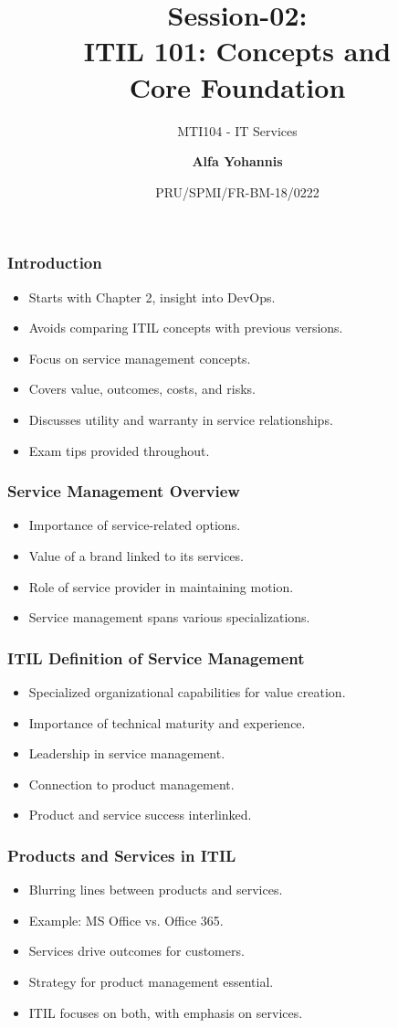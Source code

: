 \documentclass[aspectratio=169, table]{beamer}
\subtitle{MTI104 - IT Services}
\title{Session-02:\\\LARGE{ITIL 101: Concepts and\\Core Foundation}}
\date[Serial]{\scriptsize {PRU/SPMI/FR-BM-18/0222}}
\author[Pradita]{\small{\textbf{Alfa Yohannis}}}
\begin{document}
\frame{\titlepage}

\begin{frame}
	\frametitle{Introduction}
	\begin{itemize}
		\item Starts with Chapter 2, insight into DevOps.
		\item Avoids comparing ITIL concepts with previous versions.
		\item Focus on service management concepts.
		\item Covers value, outcomes, costs, and risks.
		\item Discusses utility and warranty in service relationships.
		\item Exam tips provided throughout.
	\end{itemize}
\end{frame}

\begin{frame}
	\frametitle{Service Management Overview}
	\begin{itemize}
		\item Importance of service-related options.
		\item Value of a brand linked to its services.
		\item Role of service provider in maintaining motion.
		\item Service management spans various specializations.
	\end{itemize}
\end{frame}

\begin{frame}
	\frametitle{ITIL Definition of Service Management}
	\begin{itemize}
		\item Specialized organizational capabilities for value creation.
		\item Importance of technical maturity and experience.
		\item Leadership in service management.
		\item Connection to product management.
		\item Product and service success interlinked.
	\end{itemize}
\end{frame}

\begin{frame}
	\frametitle{Products and Services in ITIL}
	\begin{itemize}
		\item Blurring lines between products and services.
		\item Example: MS Office vs. Office 365.
		\item Services drive outcomes for customers.
		\item Strategy for product management essential.
		\item ITIL focuses on both, with emphasis on services.
	\end{itemize}
\end{frame}
\end{document}
